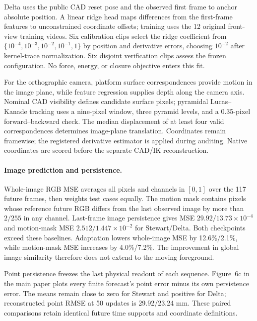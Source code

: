 Delta uses the public CAD reset pose and the observed first frame to anchor absolute position. A linear ridge head maps differences from the first-frame features to unconstrained coordinate offsets; training uses the 12 original front-view training videos. Six calibration clips select the ridge coefficient from $\{10^{-4},10^{-3},10^{-2},10^{-1},1\}$ by position and derivative errors, choosing $10^{-2}$ after kernel-trace normalization. Six disjoint verification clips assess the frozen configuration. No force, energy, or closure objective enters this fit.

For the orthographic camera, platform surface correspondences provide motion in the image plane, while feature regression supplies depth along the camera axis. Nominal CAD visibility defines candidate surface pixels; pyramidal Lucas--Kanade tracking uses a nine-pixel window, three pyramid levels, and a 0.35-pixel forward--backward check. The median displacement of at least four valid correspondences determines image-plane translation. Coordinates remain framewise; the registered derivative estimator is applied during auditing. Native coordinates are scored before the separate CAD/IK reconstruction.

\paragraph{Image prediction and persistence.}
Whole-image RGB MSE averages all pixels and channels in $[0,1]$ over the 117 future frames, then weights test cases equally. The motion mask contains pixels whose reference future RGB differs from the last observed image by more than $2/255$ in any channel. Last-frame image persistence gives MSE $29.92/13.73\times10^{-4}$ and motion-mask MSE $2.512/1.447\times10^{-2}$ for Stewart/Delta. Both checkpoints exceed these baselines. Adaptation lowers whole-image MSE by 12.6\%/2.1\%, while motion-mask MSE increases by 4.0\%/7.2\%. The improvement in global image similarity therefore does not extend to the moving foreground.

Point persistence freezes the last physical readout of each sequence. Figure~6c in the main paper plots every finite forecast's point error minus its own persistence error. The means remain close to zero for Stewart and positive for Delta; reconstructed point RMSE at 50 updates is 29.92/23.24 mm. These paired comparisons retain identical future time supports and coordinate definitions.

